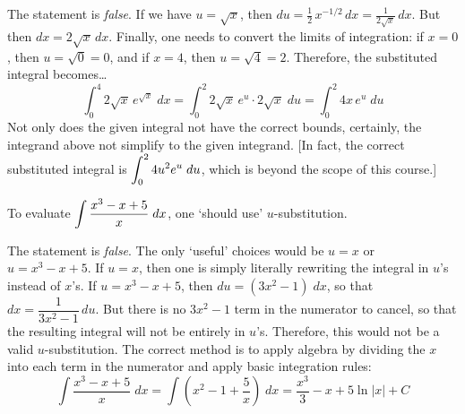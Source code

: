 \documentclass[11pt,letterpaper]{article}
\begin{document}
\sol The statement is \textit{false}. If we have $u= \sqrt{x}$, then $du= \frac{1}{2} \, x^{-1/2} \,dx= \frac{1}{2\sqrt{x}} \,dx$. But then $dx= 2 \sqrt{x} \, dx$. Finally, one needs to convert the limits of integration: if $x= 0$, then $u= \sqrt{0}= 0$, and if $x= 4$, then $u= \sqrt{4}= 2$. Therefore, the substituted integral becomes\dots
	\[
	\int_0^4 2 \sqrt{x} \, e^{\sqrt{x}} \;dx= \int_0^2 2 \sqrt{x} \, e^u \cdot 2 \sqrt{x} \; du= \int_0^2 4x \, e^u \; du
	\]
Not only does the given integral not have the correct bounds, certainly, the integrand above not simplify to the given integrand. [In fact, the correct substituted integral is $\displaystyle\int_0^2 4 u^2 e^u \;du$, which is beyond the scope of this course.] \pvspace{1.3cm}



 To evaluate $\displaystyle\int \dfrac{x^3 - x + 5}{x} \;dx$, one `should use' $u$-substitution. \pspace

\sol The statement is \textit{false}. The only `useful' choices would be $u= x$ or $u= x^3 - x + 5$. If $u= x$, then one is simply literally rewriting the integral in $u$'s instead of $x$'s. If $u= x^3 - x + 5$, then $du= (3x^2 - 1) \;dx$, so that $dx= \dfrac{1}{3x^2 - 1} \,du$. But there is no $3x^2 - 1$ term in the numerator to cancel, so that the resulting integral will not be entirely in $u$'s. Therefore, this would not be a valid $u$-substitution. The correct method is to apply algebra by dividing the $x$ into each term in the numerator and apply basic integration rules:
	\[
	\int \dfrac{x^3 - x + 5}{x} \;dx= \int \left(x^2 - 1 + \dfrac{5}{x} \right) \;dx= \dfrac{x^3}{3} - x + 5 \ln|x| + C
	\] 
\end{document}
